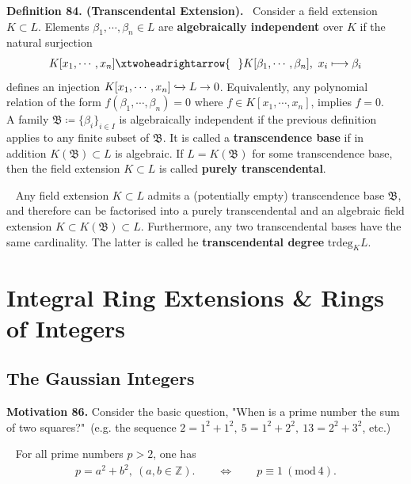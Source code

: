 \documentclass[12pt,a4paper,footinclude=true,headinclude=true]{scrbook} %
\newenvironment{theorem}[2][]
{\renewcommand\theinnercustomthm{#2}\innercustomthm[#1]
\begin{mdframed}[backgroundcolor=yellow!20]\ }
{\end{mdframed}\endinnercustomthm}
\newenvironment{proposition}[2][]
{\renewcommand\theinnercustomprop{#2}\innercustomprop[#1] 
\begin{mdframed}[backgroundcolor=gray!20]\ }
{\end{mdframed}\endinnercustomprop}
\newenvironment{definition}[2][Definition]
    { \begin{mdframed}[backgroundcolor=gray!20] \textbf{#1 #2.}\ }
    {  \end{mdframed}}
\newenvironment{motivation}[2][Motivation]
    { \begin{mdframed}[backgroundcolor=red!20] \textbf{#1 #2.} }
    {  \end{mdframed}}
\begin{document}
\begin{definition}{84. (Transcendental Extension)}
    Consider a field extension $K\subset L$. Elements $\beta_1,\cdots,\beta_n\in L$ are \textbf{algebraically independent} over $K$ if the natural surjection \begin{align*}
        K[x_1,\cdots,x_n]\xtwoheadrightarrow{~~} K[\beta_1,\cdots,\beta_n],\ x_i\longmapsto\beta_i
    \end{align*}
    defines an injection $K[x_1,\cdots,x_n]\xhookrightarrow{} L\to0$. Equivalently, any polynomial relation of the form $f(\beta_1,\cdots,\beta_n)=0$ where $f\in K[x_1,\cdots,x_n]$, implies $f=0$. \\ A family $\mathfrak{B}\coloneqq\{\beta_i\}_{i\in I}$ is algebraically independent if the previous definition applies to any finite subset of $\mathfrak{B}$. It is called a \textbf{transcendence base} if in addition $K(\mathfrak{B})\subset L$ is algebraic. If $L=K(\mathfrak{B})$ for some transcendence base, then the field extension $K\subset L$ is called \textbf{purely transcendental}.
\end{definition}

\begin{proposition}{85. (Transcendental Degree)}
    Any field extension $K\subset L$ admits a (potentially empty) transcendence base $\mathfrak{B}$, and therefore can be factorised into a purely transcendental and an algebraic field extension $K\subset K(\mathfrak{B}) \subset L$. Furthermore, any two transcendental bases have the same cardinality. The latter is called he \textbf{transcendental degree} $\mathrm{trdeg}_KL$.
\end{proposition}

\chapter{Integral Ring Extensions \& Rings of Integers}

\section{The Gaussian Integers}
\begin{motivation}{86} 
    Consider the basic question, "When is a prime number the sum of two squares?"\ (e.g. the sequence $2=1^2+1^2,\ 5=1^2+2^2,\ 13=2^2+3^2$, etc.)
\end{motivation}

\begin{theorem}{87}
    For all prime numbers $p>2$, one has 
    \begin{align*}
        p=a^2+b^2,\ (a,b\in\mathbb{Z}).\qquad \Longleftrightarrow \qquad p\equiv1\ (\mathrm{mod}\ 4).
    \end{align*}
\end{theorem}
\end{document}
